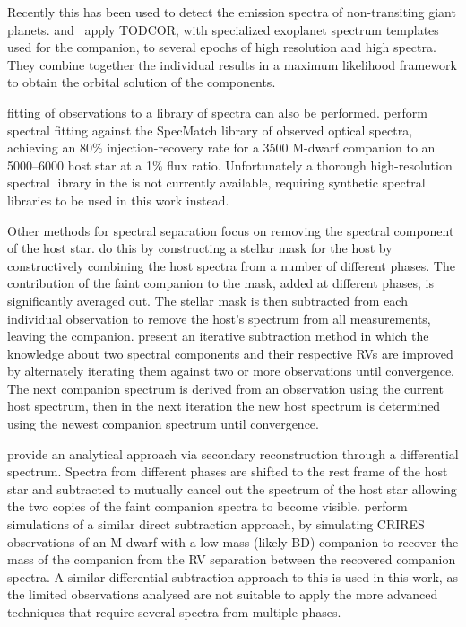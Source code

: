 Recently this has been used to detect the emission spectra of non-transiting giant planets.
\citet{lockwood_nearir_2014} and~\citet{piskorz_evidence_2016} apply TODCOR, with specialized exoplanet spectrum templates used for the companion, to several epochs of high resolution and high \snr{} \nir{} spectra.
They combine together the individual results in a maximum likelihood framework to obtain the orbital solution of the components.

\textchisquared{} fitting of observations to a library of spectra can also be performed.
\citet{kolbl_detection_2015} perform spectral fitting against the {SpecMatch} library of observed optical spectra, achieving an 80\% injection-recovery rate for a 3500\K{} {M-dwarf} companion to an 5000--6000\K{} host star at a 1\% flux ratio.
Unfortunately a thorough high-resolution spectral library in the \nir{} is not currently available, requiring synthetic spectral libraries to be used in this work instead.

Other methods for spectral separation focus on removing the spectral component of the host star.
\citet{rodler_weighing_2012} do this by constructing a stellar mask for the host by constructively combining the host spectra from a number of different phases.
The contribution of the faint companion to the mask, added at different phases, is significantly averaged out.
The stellar mask is then subtracted from each individual observation to remove the host's spectrum from all measurements, leaving the companion.
\citet{gonzalez_separation_2006} present an iterative subtraction method in which the knowledge about two spectral components and their respective {RV}s are improved by alternately iterating them against two or more observations until convergence. The next companion spectrum is derived from an observation using the current host spectrum, then in the next iteration the new host spectrum is determined using the newest companion spectrum until convergence.

\citet{ferluga_separating_1997} provide an analytical approach via secondary reconstruction through a differential spectrum.
Spectra from different phases are shifted to the rest frame of the host star and subtracted to mutually cancel out the spectrum of the host star allowing the two copies of the faint companion spectra to become visible.
\citet{kostogryz_spectral_2013} perform simulations of a similar direct subtraction approach, by simulating CRIRES observations of an {M-dwarf} with a low mass (likely BD) companion to recover the mass of the companion from the {RV} separation between the recovered companion spectra.
A similar differential subtraction approach to this is used in this work, as the limited observations analysed are not suitable to apply the more advanced techniques that require several spectra from multiple phases.
